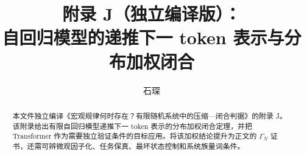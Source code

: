 \documentclass[UTF8,fontset=fandol,11pt,a4paper]{ctexart}
\title{\bfseries 附录 J（独立编译版）：\\自回归模型的递推下一 token 表示与分布加权闭合}
\author{石琛}
\date{}
\begin{document}
\maketitle

\begin{abstract}
本文件独立编译《宏观规律何时存在？有限随机系统中的压缩—闭合判据》的附录 J。该附录给出有限自回归模型递推下一 token 表示的分布加权闭合定理，并把 Transformer 作为需要独立验证条件的目标应用。将该加权结论提升为正文的 $\Gamma_N$ 证书，还需可辨微观因子化、任务保真、最坏状态控制和系统族量词条件。
\end{abstract}

\tableofcontents
\clearpage
\newcommand{\TransformerEquationPrefix}{S}
\renewcommand{\thesection}{S1}


\clearpage
\begingroup
\sloppy


\endgroup
\end{document}
